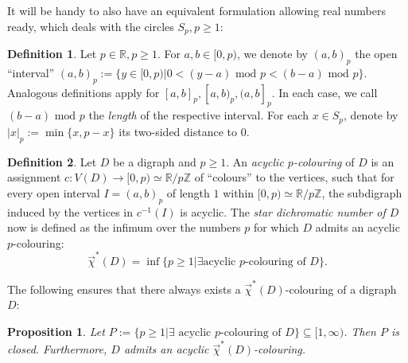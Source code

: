 \documentclass[fontsize=11pt,a4paper,DIV12]{scrartcl}
\theoremstyle{meiner}
\newtheorem{proposition}{Proposition}
\theoremstyle{definition}
\newtheorem{definition}{Definition}
\begin{document}
It will be handy to also have an equivalent formulation allowing real numbers ready, which deals with the circles $S_p, p \ge 1$:
\begin{definition}
Let $p \in \mathbb{R}, p \ge 1$. For $a,b \in [0,p)$, we denote by $(a,b)_p$ the open ``interval'' $(a,b)_p:=\{y \in [0,p)|0<(y-a) \text{ mod }p < (b-a) \text{ mod }p \}$. Analogous definitions apply for $[a,b]_p,[a,b)_p, (a,b]_p$. In each case, we call $(b-a) \text{ mod }p$ the \emph{length} of the respective interval. For each $x \in S_p$, denote by $|x|_p:=\min\{x,p-x\}$ its two-sided distance to $0$.
\end{definition}
\begin{definition}
  Let $D$ be a digraph and $p \ge 1$. An \emph{acyclic $p$-colouring}
  of $D$ is an assignment $c:V(D) \rightarrow [0,p) \simeq
  \mathbb{R}/p\mathbb{Z}$ of ``colours'' to the vertices, such that
  for every open interval $I=(a,b)_p$ of length $1$ within $[0,p)
  \simeq \mathbb{R}/p\mathbb{Z}$, the subdigraph induced by the
  vertices in $c^{-1}(I)$ is acyclic.  The \emph{star dichromatic
    number of $D$}  now is defined as the infimum over the numbers $p$
  for which $D$ admits an acyclic $p$-colouring:
$$\vec{\chi}^\ast(D)=\inf\{p \ge 1|\exists \text{acyclic }p\text{-colouring of }D\}.$$

\end{definition}
The following ensures that there always exists a
$\vec{\chi}^\ast(D)$-colouring of a digraph $D$:
\begin{proposition} \label{closed} Let $P:=\{p \ge 1|\exists \text{ acyclic
  }p\text{-colouring of }D\} \subseteq [1,\infty)$. Then $P$ is
  closed. Furthermore, $D$ admits an acyclic
  $\vec{\chi}^\ast(D)$-colouring.
\end{proposition}
\end{document}

